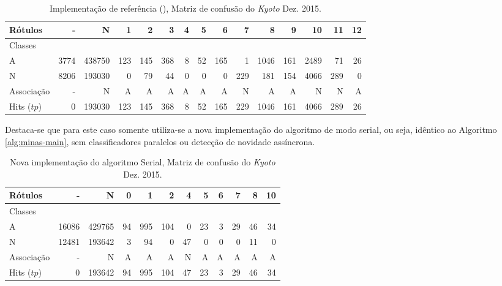 \begin{table}[hbt]%
  {\footnotesize
  \setlength\tabcolsep{0.5em}
  \begin{center}
  \caption{Implementação de referência (), Matriz de confusão do \dataset \emph{Kyoto} Dez. 2015.}
  \label{tab:java-matrix}
  \begin{tabular}{l *{14}{|r} }
    Rótulos   &     - &       N &    1 &    2 &    3 &  4 &   5 &    6 &    7 &     8 &    9 &    10 &   11 &  12 \\\hline
    Classes  &       &         &      &      &      &    &     &      &      &       &      &       &      &     \\\hline
    \hline
    A        &  3774 &  438750 &  123 &  145 &  368 &  8 &  52 &  165 &    1 &  1046 &  161 &  2489 &   71 &  26 \\\hline
    N        &  8206 &  193030 &    0 &   79 &   44 &  0 &   0 &    0 &  229 &   181 &  154 &  4066 &  289 &   0 \\\hline
    \hline
    Associação &     - &       N &    A &    A &    A &  A &   A &    A &    N &     A &    A &     N &    N &   A \\\hline
    Hits ($tp$)     &     0 &  193030 &  123 &  145 &  368 &  8 &  52 &  165 &  229 &  1046 &  161 &  4066 &  289 &  26 
  \end{tabular}
\end{center}
}
\end{table}

Destaca-se que para este caso somente utiliza-se a nova implementação do algoritmo
\minas de modo serial, ou seja, idêntico ao Algoritmo \ref{alg:minas-main}, sem
classificadores paralelos ou detecção de novidade assíncrona.

\begin{table}[hbt]%
  {\footnotesize
  \setlength\tabcolsep{0.5em}
  \begin{center}
  \caption{Nova implementação do algoritmo \minas Serial, Matriz de confusão do \dataset \emph{Kyoto} Dez. 2015.}
  \label{tab:libc-matrix}
  \begin{tabular}{l|r|r|r|r|r|r|r|r|r|r|r}
    Rótulos &      - &       N &   0 &    1 &    2 &   4 &   5 &  6 &   7 &   8 &  10 \\\hline
    Classes  &        &         &     &      &      &     &     &    &     &     &     \\\hline
    \hline
    A        &  16086 &  429765 &  94 &  995 &  104 &   0 &  23 &  3 &  29 &  46 &  34 \\\hline
    N        &  12481 &  193642 &   3 &   94 &    0 &  47 &   0 &  0 &   0 &  11 &   0 \\\hline
    \hline
    Associação &      - &       N &   A &    A &    A &   N &   A &  A &   A &   A &   A \\\hline
    Hits ($tp$)     &      0 &  193642 &  94 &  995 &  104 &  47 &  23 &  3 &  29 &  46 &  34 
  \end{tabular}
  \end{center}
  }
\end{table}

